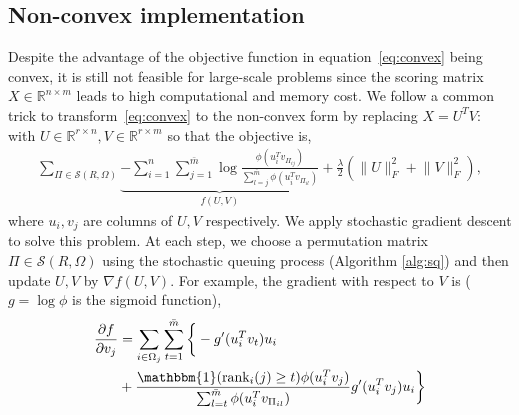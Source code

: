 \documentclass{article}
\def\R{\mathbb{R}}
\def\R{\mathbb{R}}
\begin{document}
\subsection{Non-convex implementation}
Despite the advantage of the objective function in equation~\eqref{eq:convex} being convex, it is still not feasible for large-scale problems since the scoring matrix $X\in \R^{n\times m}$ leads to high computational and memory cost. We follow a common trick to transform~\eqref{eq:convex} to the non-convex form by replacing $X=U^TV$:
with  $U \in \R^{r \times n}, V\in \R^{r \times m}$ so that the objective is,
\begin{align*}
    \! \sum_{\Pi \in \mathcal S (R, \Omega)}\!\! \underbrace{-\sum_{i=1}^{n} \sum_{j=1}^{\bar{m}}   \log  \frac{\phi(u_i^T v_{\Pi_{ij}})}{\sum_{l=j}^{\bar{m}} \phi(u_i^T v_{\Pi_{il}})}}_{f(U, V)} %
   \! +\! \frac{\lambda}{2} (\|U\|_F^2 \!+\! \|V\|_F^2), 
   \label{eq:nonconvex}
\end{align*}
where $u_i, v_j$ are columns of $U, V$ respectively. We apply stochastic gradient descent to solve this problem. At each step, we choose a permutation matrix $\Pi\in\mathcal S (R, \Omega) $ 
using the stochastic queuing process (Algorithm \ref{alg:sq}) and then update $U, V$ by $\nabla f(U, V)$. For example, the gradient with respect to $V$ is ($g = \log \phi$ is the sigmoid function),
\begin{align*}
\frac{\partial f}{\partial v_j} &= \sum_{i\in \Omega_j} \sum_{t=1}^{\bar{m}}\bigg\{ -g'(u_i^T v_t) u_i \\
& + \frac{\mathbbm{1}(\text{rank}_i(j)\geq t) \phi(u_i^T v_j)}{\sum_{l=t}^{\bar{m}}\phi(u_i^T v_{\Pi_{il}})} g'(u_i^T v_j)u_i\bigg\}
\end{align*}
\end{document}
